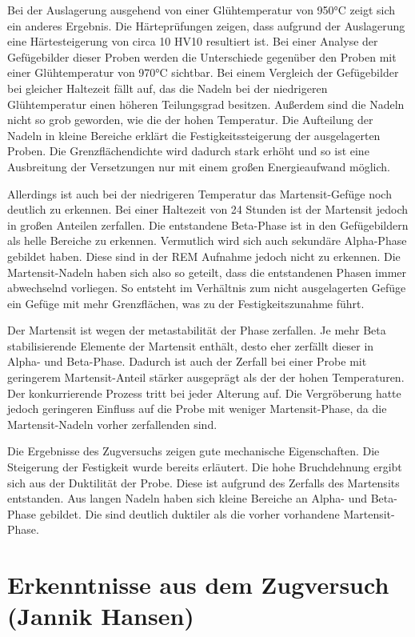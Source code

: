 \documentclass[a4paper, 11pt]{tubsreprt}
\begin{document}
Bei der Auslagerung ausgehend von einer Glühtemperatur von 950°C zeigt sich ein anderes Ergebnis. Die Härteprüfungen zeigen, dass aufgrund der Auslagerung eine Härtesteigerung von circa 10 HV10 resultiert ist. Bei einer Analyse der Gefügebilder dieser Proben werden die Unterschiede gegenüber den Proben mit einer Glühtemperatur von 970°C sichtbar. Bei einem Vergleich der Gefügebilder bei gleicher Haltezeit fällt auf, das die Nadeln bei der niedrigeren Glühtemperatur einen höheren Teilungsgrad besitzen. Außerdem sind die Nadeln nicht so grob geworden, wie die der hohen Temperatur. Die Aufteilung der Nadeln in kleine Bereiche erklärt die Festigkeitssteigerung der ausgelagerten Proben. Die Grenzflächendichte wird dadurch stark erhöht und so ist eine Ausbreitung der Versetzungen nur mit einem großen Energieaufwand möglich. 

Allerdings ist auch bei der niedrigeren Temperatur das Martensit-Gefüge noch deutlich zu erkennen. Bei einer Haltezeit von 24 Stunden ist der Martensit jedoch in großen Anteilen zerfallen. Die entstandene Beta-Phase ist in den Gefügebildern als helle Bereiche zu erkennen. Vermutlich wird sich auch sekundäre Alpha-Phase gebildet haben. Diese sind in der REM Aufnahme jedoch nicht zu erkennen. Die Martensit-Nadeln haben sich also so geteilt, dass die entstandenen Phasen immer abwechselnd vorliegen. So entsteht im Verhältnis zum nicht ausgelagerten Gefüge ein Gefüge mit mehr Grenzflächen, was zu der Festigkeitszunahme führt.

Der Martensit ist wegen der metastabilität der Phase zerfallen. Je mehr Beta stabilisierende Elemente der Martensit enthält, desto eher zerfällt dieser in Alpha- und Beta-Phase. Dadurch ist auch der Zerfall bei einer Probe mit geringerem Martensit-Anteil stärker ausgeprägt als der der hohen Temperaturen. Der konkurrierende Prozess tritt bei jeder Alterung auf. Die Vergröberung hatte jedoch geringeren Einfluss auf die Probe mit weniger Martensit-Phase, da die Martensit-Nadeln vorher zerfallenden sind. 


Die Ergebnisse des Zugversuchs zeigen gute mechanische Eigenschaften. Die Steigerung der Festigkeit wurde bereits erläutert. Die hohe Bruchdehnung ergibt sich aus der Duktilität der Probe. Diese ist aufgrund des Zerfalls des Martensits entstanden. Aus langen Nadeln haben sich kleine Bereiche an Alpha- und Beta-Phase gebildet. Die sind deutlich duktiler als die vorher vorhandene Martensit-Phase.


\section{Erkenntnisse aus dem Zugversuch (Jannik Hansen)}
\end{document}
